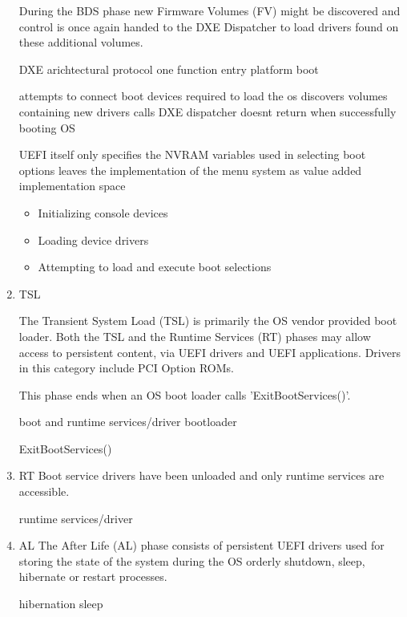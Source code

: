 \begin{enumerate}

    During the BDS phase new Firmware Volumes (FV) might be discovered and control is once again handed to the DXE Dispatcher to load drivers found on these additional volumes.


    DXE arichtectural protocol
    one function entry
    platform boot

    attempts to connect boot devices required to load the os
    discovers volumes containing new drivers
    calls DXE dispatcher
    doesnt return when successfully booting OS

    UEFI itself only specifies the NVRAM variables used in selecting boot options
    leaves the implementation of the menu system as value added implementation space \cite{uefi-spec}

    \cite{pi-spec}

    \begin{itemize}
        \item Initializing console devices
        \item Loading device drivers
        \item Attempting to load and execute boot selections
    \end{itemize}

    \item{\acf{TSL}}

    The Transient System Load (TSL) is primarily the OS vendor provided boot loader. Both the TSL and the Runtime Services (RT) phases may allow access to persistent content, via UEFI drivers and UEFI applications. Drivers in this category include PCI Option ROMs.

    This phase ends when an OS boot loader calls 'ExitBootServices()'.

    boot and runtime services/driver
    bootloader
    \cite[Section 13.3]{uefi-spec}
    \cite[Section 3.5.1.1]{uefi-spec}

    ExitBootServices()

    \item{\acf{RT}}
    Boot service drivers have been unloaded and only runtime services are accessible.


    runtime services/driver

    \item{\acf{AL}}
    The After Life (AL) phase consists of persistent UEFI drivers used for storing the state of the system during the OS orderly shutdown, sleep, hibernate or restart processes.

    hibernation
    sleep

\end{enumerate}


